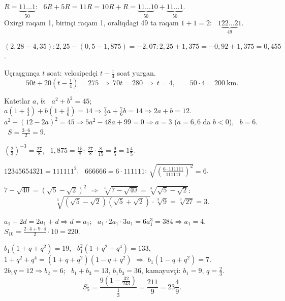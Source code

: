 




$R=\underbrace{11\ldots1}_{50}$: \ $6R+5R=11R=10R+R=\underbrace{11\ldots1}_{50}0+\underbrace{11\ldots1}_{50}$.\\
Oxirgi raqam 1, birinçi raqam 1, oraliqdagi 49 ta raqam $1+1=2$: \ $1\underbrace{22\ldots2}_{49}1$.

$(2{,}28-4{,}35):2{,}25-(0{,}5-1{,}875)=-2{,}07:2{,}25+1{,}375=-0{,}92+1{,}375=0{,}455$.

Uçraşgunça $t$ soat: velosipedçi $t-\frac14$ soat yurgan.
\[50t+20\left(t-\tfrac14\right)=275\ \Rightarrow\ 70t=280\ \Rightarrow\ t=4,\qquad 50\cdot4=200\ \text{km}.\]

Katetlar $a$, $b$: \ $a^2+b^2=45$; \ $a\left(1+\frac43\right)+b\left(1+\frac16\right)=14\Rightarrow\frac73a+\frac76b=14\Rightarrow2a+b=12$.\\
$a^2+(12-2a)^2=45\Rightarrow5a^2-48a+99=0\Rightarrow a=3$ ($a=6{,}6$ da $b<0$), \ $b=6$. \ $S=\frac{3\cdot6}2=9$.

$\left(\frac23\right)^{-3}=\frac{27}8$, \ $1{,}875=\frac{15}8$: \quad $\frac{27}8\cdot\frac8{15}=\frac95=1\frac45$.

$12345654321=111111^2$, \ $666666=6\cdot111111$: \quad $\sqrt{\left(\frac{6\cdot111111}{111111}\right)^2}=6$.

$7-\sqrt{40}=(\sqrt5-\sqrt2)^2$ $\Rightarrow$ $\sqrt[6]{7-\sqrt{40}}=\sqrt[3]{\sqrt5-\sqrt2}$:
\[\sqrt[3]{(\sqrt5-\sqrt2)(\sqrt5+\sqrt2)}\cdot\sqrt[3]9=\sqrt[3]{27}=3.\]

$a_1+2d=2a_1+d\Rightarrow d=a_1$; \ $a_1\cdot2a_1\cdot3a_1=6a_1^3=384\Rightarrow a_1=4$.\\
$S_{10}=\frac{2\cdot4+9\cdot4}2\cdot10=220$.

$b_1(1+q+q^2)=19$, \ $b_1^2(1+q^2+q^4)=133$, \ $1+q^2+q^4=(1+q+q^2)(1-q+q^2)$ $\Rightarrow$ $b_1(1-q+q^2)=7$.\\
$2b_1q=12\Rightarrow b_2=6$; \ $b_1+b_3=13$, $b_1b_3=36$, kamayuvçi: $b_1=9$, $q=\frac23$.
\[S_5=\frac{9\left(1-\frac{32}{243}\right)}{\frac13}=\frac{211}9=23\frac49.\]

